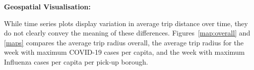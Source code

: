 \documentclass[11pt]{article}
\begin{document}






\textbf{Geospatial Visualisation:}    

While time series plots display variation in average trip distance over time, 
they do not clearly convey the meaning of these differences.
Figures~\ref{map:overall} and \ref{maps} compares the average trip radius overall, 
the average trip radius for the week with maximum COVID-19 cases per capita, 
and the week with maximum Influenza cases per capita per pick-up borough.
\end{document}
